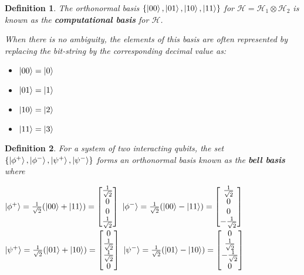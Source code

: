 \documentclass[12pt,twoside,fleqn]{report}
\theoremstyle{thmstyle}
\newtheorem{defn}{Definition}[chapter]
\begin{document}
\begin{defn}
    The orthonormal basis $\{ \ket{00}, \ket{01}, \ket{10}, \ket{11} \}$ for $\mathcal{H} = \mathcal{H}_1 \otimes \mathcal{H}_2$ is known as the \textbf{computational basis} for $\mathcal{H}$.

    When there is no ambiguity, the elements of this basis are often represented by replacing the bit-string by the corresponding decimal value as:

    \begin{itemize}
        \item $\ket{00} = \ket{0}$
        \item $\ket{01} = \ket{1}$
        \item $\ket{10} = \ket{2}$
        \item $\ket{11} = \ket{3}$
    \end{itemize}

\end{defn}
\begin{defn}
    For a system of two interacting qubits, the set $\{ \ket{\phi^+}, \ket{\phi^-}, \ket{\psi^+}, \ket{\psi^-} \}$ forms an orthonormal basis known as the \textbf{bell basis} where 

    $\ket{\phi^+} = \frac{1}{\sqrt{2}} (\ket{00} + \ket{11}) = \begin{bmatrix} \frac{1}{\sqrt{2}} \\ 0 \\ 0 \\ \frac{1}{\sqrt{2}} \end{bmatrix}$
    $\ket{\phi^-} = \frac{1}{\sqrt{2}} (\ket{00} - \ket{11}) = \begin{bmatrix} \frac{1}{\sqrt{2}} \\ 0 \\ 0 \\ - \frac{1}{\sqrt{2}} \end{bmatrix}$
        $\ket{\psi^+} = \frac{1}{\sqrt{2}} (\ket{01} + \ket{10}) = \begin{bmatrix} 0 \\ \frac{1}{\sqrt{2}} \\ \frac{1}{\sqrt{2}} \\0 \end{bmatrix}$
        $\ket{\psi^-} = \frac{1}{\sqrt{2}} (\ket{01} - \ket{10}) = \begin{bmatrix} 0 \\ \frac{1}{\sqrt{2}} \\ - \frac{1}{\sqrt{2}} \\0 \end{bmatrix}$
\end{defn}
\end{document}
